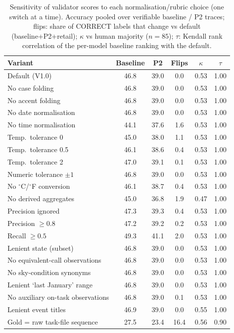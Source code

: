 \begin{table}[t]
\centering
\caption{Sensitivity of validator scores to each normalisation/rubric choice (one switch at a time). Accuracy pooled
over verifiable baseline / P2 traces; flips: share of CORRECT labels that change vs default (baseline+P2+retail);
$\kappa$ vs human majority ($n=85$); $\tau$: Kendall rank correlation of the per-model baseline
ranking with the default.}
\label{tab:validator-robustness}
\small
\begin{tabular}{@{}lccccc@{}}
\toprule
Variant & Baseline & P2 & Flips & $\kappa$ & $\tau$ \\
\midrule
Default (V1.0) & 46.8 & 39.0 & 0.0 & 0.53 & 1.00 \\
No case folding & 46.8 & 39.0 & 0.0 & 0.53 & 1.00 \\
No accent folding & 46.8 & 39.0 & 0.0 & 0.53 & 1.00 \\
No date normalisation & 46.8 & 39.0 & 0.0 & 0.53 & 1.00 \\
No time normalisation & 44.1 & 37.6 & 1.6 & 0.53 & 1.00 \\
Temp.\ tolerance 0 & 45.0 & 38.0 & 1.1 & 0.53 & 1.00 \\
Temp.\ tolerance 0.5 & 46.1 & 38.6 & 0.4 & 0.53 & 1.00 \\
Temp.\ tolerance 2 & 47.0 & 39.1 & 0.1 & 0.53 & 1.00 \\
Numeric tolerance $\pm1$ & 46.8 & 39.0 & 0.0 & 0.53 & 1.00 \\
No $^\circ$C/$^\circ$F conversion & 46.1 & 38.7 & 0.4 & 0.53 & 1.00 \\
No derived aggregates & 45.0 & 36.8 & 1.9 & 0.47 & 1.00 \\
Precision ignored & 47.3 & 39.3 & 0.4 & 0.53 & 1.00 \\
Precision $\ge 0.8$ & 47.2 & 39.2 & 0.2 & 0.53 & 1.00 \\
Recall $\ge 0.5$ & 49.3 & 41.1 & 2.0 & 0.53 & 1.00 \\
Lenient state (subset) & 46.8 & 39.0 & 0.0 & 0.53 & 1.00 \\
No equivalent-call observations & 46.8 & 39.0 & 0.0 & 0.53 & 1.00 \\
No sky-condition synonyms & 46.8 & 39.0 & 0.0 & 0.53 & 1.00 \\
Lenient `last January' range & 46.8 & 39.0 & 0.0 & 0.53 & 1.00 \\
No auxiliary on-task observations & 46.8 & 39.0 & 0.1 & 0.53 & 1.00 \\
Lenient event titles & 46.9 & 39.0 & 0.0 & 0.55 & 1.00 \\
\midrule
Gold = raw task-file sequence & 27.5 & 23.4 & 16.4 & 0.56 & 0.90 \\
\bottomrule
\end{tabular}
\end{table}
